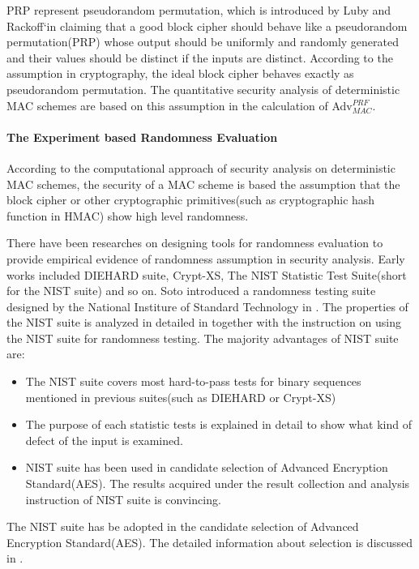 \documentclass{article}
\begin{document}
PRP represent pseudorandom permutation, which is introduced by Luby and Rackoff`in \cite{PRP} claiming that a good block cipher should
behave like a pseudorandom permutation(PRP) whose output should be uniformly and randomly generated and their values
should be distinct if the inputs are distinct.
According to the assumption in cryptography, the ideal block cipher behaves exactly as pseudorandom permutation. The quantitative security analysis of deterministic MAC schemes are based on this assumption in the calculation of Adv$^{PRF}_{MAC}$.
\paragraph{The Experiment based Randomness Evaluation}
According to the computational approach of security analysis on deterministic MAC schemes, the security of a MAC scheme is based the assumption that the block cipher or other cryptographic primitives(such as cryptographic hash function in HMAC) show high level randomness. 

There have been researches on designing tools for randomness evaluation to provide empirical evidence of randomness assumption in security analysis.
Early works included DIEHARD suite, Crypt-XS, The NIST
Statistic Test Suite(short for the NIST suite) and so on. Soto introduced a randomness testing suite designed by the National Institure of Standard Technology in \cite{Soto1999}. The properties of the NIST suite is analyzed in detailed in \cite{NIST_suite} together with the instruction on using the NIST suite for randomness testing.
The majority advantages of NIST suite are:
\begin{itemize}
	\item The NIST suite covers most hard-to-pass tests for binary sequences
	mentioned in previous suites(such as DIEHARD or Crypt-XS)
	\item The purpose of each statistic tests is explained in detail to show
	what kind of defect of the input is examined.
	\item NIST suite has been used in candidate selection of Advanced Encryption
	Standard(AES). The results acquired under the result collection and analysis instruction of NIST suite is
	convincing.
\end{itemize}
The NIST suite has be adopted in the candidate selection of Advanced Encryption Standard(AES). The detailed information about selection is discussed in \cite{candidate_test,final_test}. 
\end{document}
